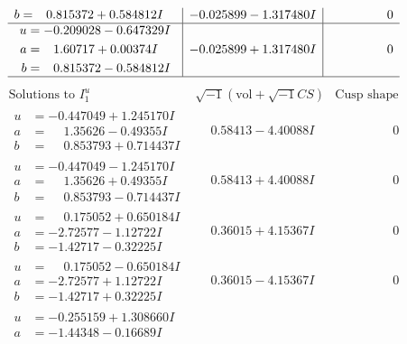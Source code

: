 \documentclass[1p]{elsarticle_modified}
\theoremstyle{definition}
\newcommand{\I}{\sqrt{-1}}
\begin{document}
$$\begin{array}{c|c|c}
\begin{aligned}
b &= \phantom{-}0.815372 + 0.584812 I\end{aligned}
 & -0.025899 - 1.317480 I & \phantom{-0.000000 } 0 \\ \hline\begin{aligned}
u &= -0.209028 - 0.647329 I \\
a &= \phantom{-}1.60717 + 0.00374 I \\
b &= \phantom{-}0.815372 - 0.584812 I\end{aligned}
 & -0.025899 + 1.317480 I & \phantom{-0.000000 } 0\\
 \hline 
 \end{array}$$\newpage$$\begin{array}{c|c|c}  
\text{Solutions to }I^u_{1}& \I (\text{vol} + \sqrt{-1}CS) & \text{Cusp shape}\\
 \hline 
\begin{aligned}
u &= -0.447049 + 1.245170 I \\
a &= \phantom{-}1.35626 - 0.49355 I \\
b &= \phantom{-}0.853793 + 0.714437 I\end{aligned}
 & \phantom{-}0.58413 - 4.40088 I & \phantom{-0.000000 } 0 \\ \hline\begin{aligned}
u &= -0.447049 - 1.245170 I \\
a &= \phantom{-}1.35626 + 0.49355 I \\
b &= \phantom{-}0.853793 - 0.714437 I\end{aligned}
 & \phantom{-}0.58413 + 4.40088 I & \phantom{-0.000000 } 0 \\ \hline\begin{aligned}
u &= \phantom{-}0.175052 + 0.650184 I \\
a &= -2.72577 - 1.12722 I \\
b &= -1.42717 - 0.32225 I\end{aligned}
 & \phantom{-}0.36015 + 4.15367 I & \phantom{-0.000000 } 0 \\ \hline\begin{aligned}
u &= \phantom{-}0.175052 - 0.650184 I \\
a &= -2.72577 + 1.12722 I \\
b &= -1.42717 + 0.32225 I\end{aligned}
 & \phantom{-}0.36015 - 4.15367 I & \phantom{-0.000000 } 0 \\ \hline\begin{aligned}
u &= -0.255159 + 1.308660 I \\
a &= -1.44348 - 0.16689 I \\

\end{aligned}
\end{array}$$
\end{document}
